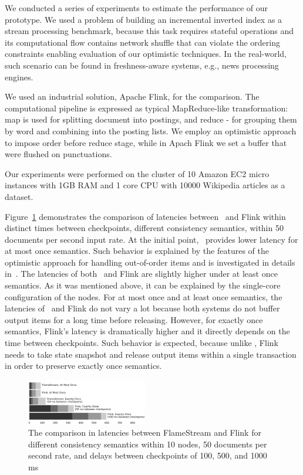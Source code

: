 \label {fs-short-experiments}

We conducted a series of experiments to estimate the performance of our prototype. We used a problem of building an incremental inverted index as a stream processing benchmark, because this task requires stateful operations and its computational flow contains network shuffle that can violate the ordering constraints enabling evaluation of our optimistic techniques. In the real-world, such scenario can be found in freshness-aware systems, e.g., news processing engines.

We used an industrial solution, Apache Flink, for the comparison. The computational pipeline is expressed as typical MapReduce-like transformation: map is used for splitting document into postings, and reduce - for grouping them by word and combining into the posting lists. We employ an optimistic approach to impose order before reduce stage, while in Apach Flink we set a buffer that were flushed on punctuations.

Our experiments were performed on the cluster of 10 Amazon EC2 micro instances with 1GB RAM and 1 core CPU with 10000 Wikipedia articles as a dataset.

Figure~\ref{performance} demonstrates the comparison of latencies between \FlameStream\ and Flink within distinct times between checkpoints, different consistency semantics, within 50 documents per second input rate. At the initial point, \FlameStream\ provides lower latency for at most once semantics. Such behavior is explained by the features of the optimistic approach for handling out-of-order items and is investigated in details in~\cite{we2018seim}. The latencies of both \FlameStream\ and Flink are slightly higher under at least once semantics. As it was mentioned above, it can be explained by the single-core configuration of the nodes. For at most once and at least once semantics, the latencies of \FlameStream\ and Flink do not vary a lot because both systems do not buffer output items for a long time before releasing. However, for exactly once semantics, Flink's latency is dramatically higher and it directly depends on the time between checkpoints. Such behavior is expected, because unlike \FlameStream, Flink needs to take state snapshot and release output items within a single transaction in order to preserve exactly once semantics.

\begin{figure}[htbp]
  \centering
  \includegraphics[width=0.47\textwidth]{pics/comparison}
  \caption{The comparison in latencies between FlameStream and Flink for different consistency semantics within 10 nodes, 50 documents per second rate, and delays between checkpoints of 100, 500, and 1000 ms}
  \label {performance}
\end{figure}
